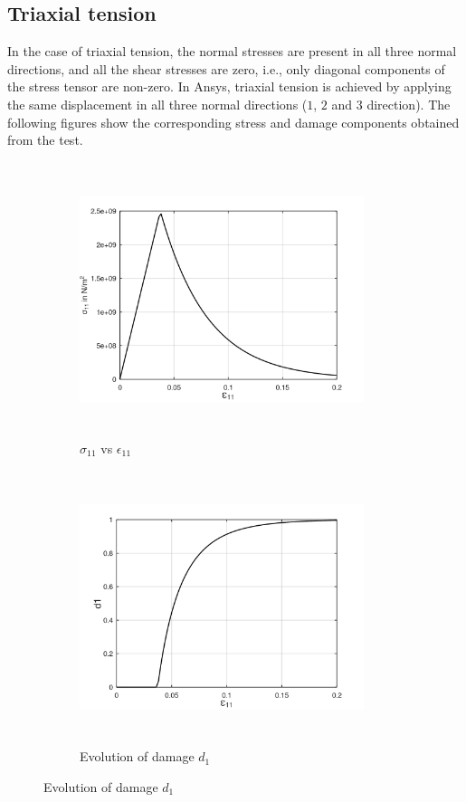 \documentclass[12pt,twoside]{report}
\begin{document}
\subsection{Triaxial tension}
\indent\indent\indent In the case of triaxial tension, the normal stresses are present in all three normal directions, and all the shear stresses are zero, i.e., only diagonal components of the stress tensor are non-zero.  In Ansys, triaxial tension is achieved by applying the same displacement in all three normal directions ($1$, $2$ and $3$ direction). The following figures show the corresponding stress and damage components obtained from the test.\\

\begin{figure}[htbp!]
       \captionsetup[subfigure]{justification=centering}
     \begin{subfigure}{0.4\textwidth}
         \includegraphics[width=8.3cm,height=8cm,keepaspectratio]{24.S11vsE11.png}
         \caption{$\sigma_{11}$ vs $\epsilon_{11}$}
         \label{fig:S11vsE11 2}
     \end{subfigure}
     \hspace{1.8cm}
     \captionsetup[subfigure]{justification=centering}
     \begin{subfigure}{0.4\textwidth}
         \includegraphics[width=8.3cm,height=8cm,keepaspectratio]{24.d1.png}
         \caption{Evolution of damage $d_{1}$}
         \label{fig:Evolution of damage d1 2}
     \end{subfigure}
\end{figure}
\end{document}
